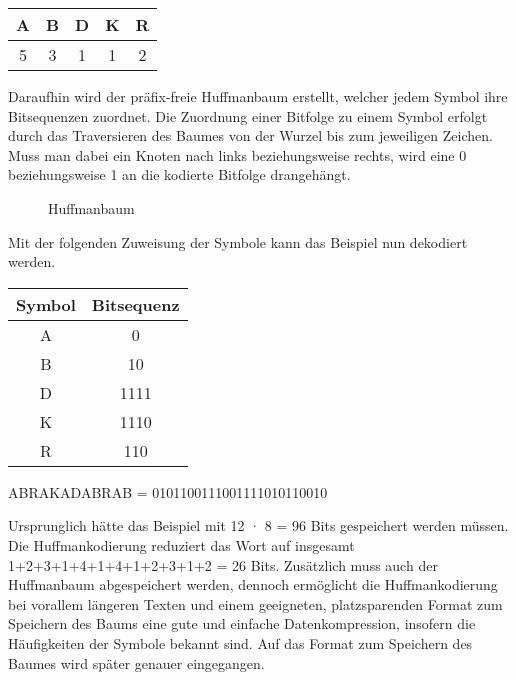 \documentclass[course=erap]{aspdoc}
\begin{document}
\begin{center}
    \begin{tabular}{ |c|c|c|c|c| }
     \hline
     A & B & D & K & R \\
     \hline
     5 & 3 & 1 & 1 & 2 \\
     \hline
    \end{tabular}
\end{center}

Daraufhin wird der präfix-freie Huffmanbaum erstellt, welcher jedem Symbol ihre Bitsequenzen zuordnet. Die Zuordnung einer Bitfolge zu einem Symbol erfolgt durch das Traversieren %
des Baumes von der Wurzel bis zum jeweiligen Zeichen. Muss man dabei ein Knoten nach links beziehungsweise rechts, wird eine 0 beziehungsweise 1 an die kodierte Bitfolge drangehängt.


\begin{figure}
    \centering
    \caption{Huffmanbaum}
\end{figure}


Mit der folgenden Zuweisung der Symbole kann das Beispiel nun dekodiert werden.

\begin{center}
    \begin{tabular}{c|c}
        \textbf{Symbol} & \textbf{Bitsequenz} \\
        \hline
        A & 0 \\
        B & 10\\
        D & 1111\\
        K & 1110\\
        R & 110
    \end{tabular}
\end{center}
\begin{center}
    ABRAKADABRAB = 0101100111001111010110010
\end{center}

Ursprunglich hätte das Beispiel mit 12 · 8 = 96 Bits gespeichert werden müssen. Die Huffmankodierung reduziert das Wort auf insgesamt 1+2+3+1+4+1+4+1+2+3+1+2 = 26 Bits. Zusätzlich muss auch der Huffmanbaum abgespeichert werden, dennoch ermöglicht die Huffmankodierung bei vorallem längeren Texten und einem geeigneten, platzsparenden Format zum Speichern des Baums eine gute und einfache Datenkompression, insofern die Häufigkeiten der Symbole bekannt sind. Auf das Format zum Speichern des Baumes wird später genauer eingegangen.\cite{4051119}
\end{document}

